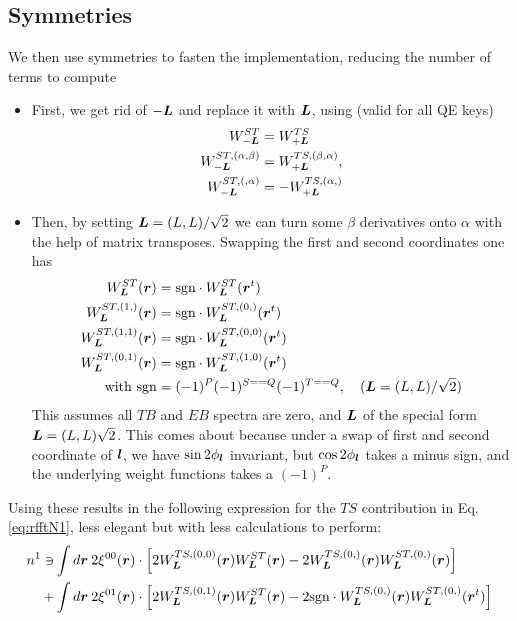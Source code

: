 \documentclass[11pt]{article}
\begin{document}
\subsection{Symmetries}
We then use symmetries to fasten the implementation, reducing the number of terms to compute
\begin{itemize}
	\item First, we get rid of $-\boldsymbol{L}$ and replace it with $\boldsymbol{L}$, using (valid for all QE keys)
\begin{equation}
\begin{split}
  W_{-\boldsymbol{L}}^{ST} &= W_{+\boldsymbol{L}}^{TS}\\
	W_{-\boldsymbol{L}}^{ST, (\alpha,\beta)} &= W_{+\boldsymbol{L}}^{TS, (\beta,\alpha)}, \\
	W_{-\boldsymbol{L}}^{ST, (,\alpha)} &= -W_{+\boldsymbol{L}}^{TS, (\alpha,)} \\
	\end{split}
	\end{equation}
\item Then, by setting $\boldsymbol{L} = (L,L)/\sqrt{2}$ we can turn some $\beta$ derivatives onto $\alpha$ with the help of matrix transposes. Swapping the first and second coordinates one has
\begin{equation}
\begin{split}
	W_{\boldsymbol{L}}^{ST}(\boldsymbol{r})& = \textrm{sgn}\cdot W^{ST}_{\boldsymbol{L}}({\boldsymbol{r}}^t) \\
	W_{\boldsymbol{L}}^{ST, (1,)}(\boldsymbol{r})& = \textrm{sgn}\cdot  W_{\boldsymbol{L}}^{ST, (0,)}(\boldsymbol{r}^t) \\
		W_{\boldsymbol{L}}^{ST, (1, 1)}(\boldsymbol{r})& = \textrm{sgn}\cdot  W_{\boldsymbol{L}}^{ST, (0,0)}(\boldsymbol{r}^t) \\
				W_{\boldsymbol{L}}^{ST, (0,1)}(\boldsymbol{r})& = \textrm{sgn}\cdot  W_{\boldsymbol{L}}^{ST, (1,0)}(\boldsymbol{r}^t) \\
		\textrm{ with sgn} &= (-1)^P (-1)^{S == Q} (-1)^{T == Q},\quad  (\boldsymbol{L} = (L,L)/\sqrt{2})\end{split}
\end{equation}
This assumes all $TB$ and $EB$ spectra are zero, and $\boldsymbol{L}$ of the special form   $\boldsymbol{L} = (L,L)\sqrt{2}$. This comes about because under a swap of first and second coordinate of $\boldsymbol{l}$, we have $\sin 2\phi_{\boldsymbol{l}}$ invariant, but $\cos 2\phi_{\boldsymbol{l}}$ takes a minus sign, and the underlying weight functions takes a $(-1)^P$.
\end{itemize}
Using these results in the following expression for the $TS$ contribution in Eq.\ref{eq:rfftN1}, less elegant but with less calculations to perform:
\begin{equation}
\begin{split}
n^{1} \ni	&\int d\boldsymbol{r} \: 2\xi^{00}(\boldsymbol{r}) \cdot \left[2W_{\boldsymbol{L}}^{TS, (0, 0)}(\boldsymbol{r}) W_{\boldsymbol{L}}^{ST}(\boldsymbol{r})- 2 W_{\boldsymbol{L}}^{TS, (0,)}(\boldsymbol{r})W_{\boldsymbol{L}}^{ST, (0,)}(\boldsymbol{r})\right] \\
	+&\int d\boldsymbol{r} \: 2\xi^{01}(\boldsymbol{r})\cdot\left[ 2 W_{\boldsymbol{L}}^{TS, (0,1)}(\boldsymbol{r}) W_{\boldsymbol{L}}^{ST}(\boldsymbol{r}) - 2\textrm{sgn}\cdot W_{\boldsymbol{L}}^{TS, (0,)}(\boldsymbol{r})W_{\boldsymbol{L}}^{ST, (0,)}(\boldsymbol{r}^t)\right]
\end{split}
\end{equation}
\end{document}
